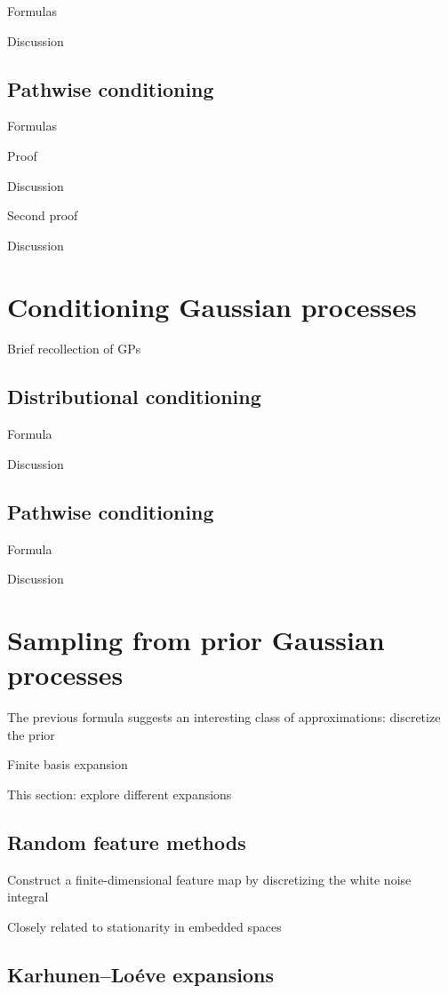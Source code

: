 \documentclass[11pt]{book}
\begin{document}
Formulas

Discussion

\subsection{Pathwise conditioning}

Formulas

Proof

Discussion

Second proof

Discussion

\section{Conditioning Gaussian processes}

Brief recollection of GPs 

\subsection{Distributional conditioning}

Formula

Discussion

\subsection{Pathwise conditioning}

Formula

Discussion

\section{Sampling from prior Gaussian processes}

The previous formula suggests an interesting class of approximations: discretize the prior

Finite basis expansion

This section: explore different expansions

\subsection{Random feature methods}

Construct a finite-dimensional feature map by discretizing the white noise integral

Closely related to stationarity in embedded spaces

\subsection{Karhunen--Loéve expansions}
\end{document}

